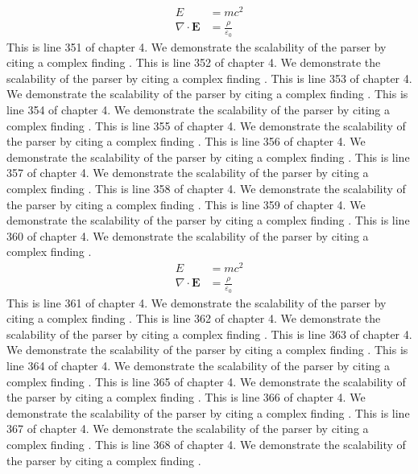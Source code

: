 \begin{align*}
  E &= mc^2 \\
  \nabla \cdot \mathbf{E} &= \frac{\rho}{\varepsilon_0}
\end{align*}
This is line 351 of chapter 4. We demonstrate the scalability of the parser by citing a complex finding \cite{ref4_351}.
This is line 352 of chapter 4. We demonstrate the scalability of the parser by citing a complex finding \cite{ref4_352}.
This is line 353 of chapter 4. We demonstrate the scalability of the parser by citing a complex finding \cite{ref4_353}.
This is line 354 of chapter 4. We demonstrate the scalability of the parser by citing a complex finding \cite{ref4_354}.
This is line 355 of chapter 4. We demonstrate the scalability of the parser by citing a complex finding \cite{ref4_355}.
This is line 356 of chapter 4. We demonstrate the scalability of the parser by citing a complex finding \cite{ref4_356}.
This is line 357 of chapter 4. We demonstrate the scalability of the parser by citing a complex finding \cite{ref4_357}.
This is line 358 of chapter 4. We demonstrate the scalability of the parser by citing a complex finding \cite{ref4_358}.
This is line 359 of chapter 4. We demonstrate the scalability of the parser by citing a complex finding \cite{ref4_359}.
This is line 360 of chapter 4. We demonstrate the scalability of the parser by citing a complex finding \cite{ref4_360}.
\begin{align*}
  E &= mc^2 \\
  \nabla \cdot \mathbf{E} &= \frac{\rho}{\varepsilon_0}
\end{align*}
This is line 361 of chapter 4. We demonstrate the scalability of the parser by citing a complex finding \cite{ref4_361}.
This is line 362 of chapter 4. We demonstrate the scalability of the parser by citing a complex finding \cite{ref4_362}.
This is line 363 of chapter 4. We demonstrate the scalability of the parser by citing a complex finding \cite{ref4_363}.
This is line 364 of chapter 4. We demonstrate the scalability of the parser by citing a complex finding \cite{ref4_364}.
This is line 365 of chapter 4. We demonstrate the scalability of the parser by citing a complex finding \cite{ref4_365}.
This is line 366 of chapter 4. We demonstrate the scalability of the parser by citing a complex finding \cite{ref4_366}.
This is line 367 of chapter 4. We demonstrate the scalability of the parser by citing a complex finding \cite{ref4_367}.
This is line 368 of chapter 4. We demonstrate the scalability of the parser by citing a complex finding \cite{ref4_368}.
